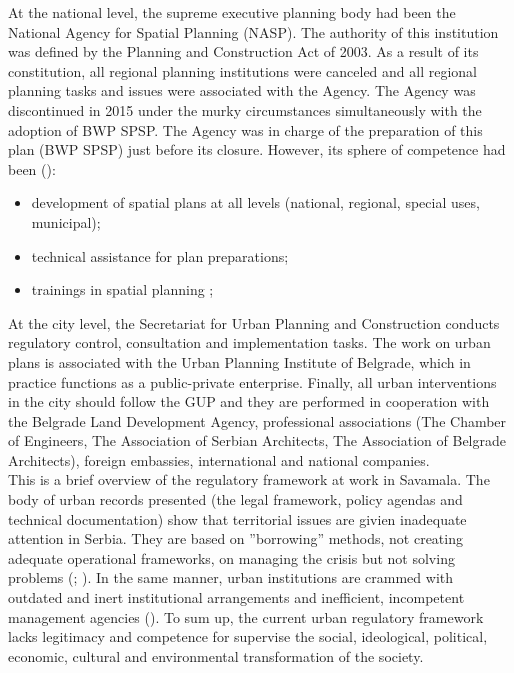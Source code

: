 \documentclass[11pt]{report}
\begin{document}
At the national level, the supreme executive planning body had been the National Agency for Spatial Planning (NASP). The authority of this institution was defined by the Planning and Construction Act of 2003.
As a result of its constitution, all regional planning institutions were canceled and all regional planning tasks and issues were associated with the Agency. 
The Agency was discontinued in 2015 under the murky circumstances simultaneously with the adoption of BWP SPSP. The Agency was in charge of the preparation of this plan (BWP SPSP) just before its closure.
However, its sphere of competence had been (\href{Maksic}{\citealt{maksic_european_2012}}):

\begin{itemize}
\item development of spatial plans at all levels (national, regional, special uses, municipal);
\item technical assistance for plan preparations;
\item trainings in spatial planning ;
\end{itemize}

At the city level, the Secretariat for Urban Planning and Construction conducts regulatory control, consultation and implementation tasks. The work on urban plans is associated with the Urban Planning Institute of Belgrade, which in practice functions as a public-private enterprise. Finally, all urban interventions in the city should follow the GUP and they are performed in cooperation with the Belgrade Land Development Agency, professional associations (The Chamber of Engineers, The Association of Serbian Architects, The Association of Belgrade Architects), foreign embassies, international and national companies.
\\
This is a brief overview of the regulatory framework at work in Savamala.  The body of urban records presented (the legal framework, policy agendas and technical documentation) show that territorial issues are givien inadequate attention in Serbia. They are based on ”borrowing” methods, not creating adequate operational frameworks, on managing the crisis but not solving problems 
(\href{Nedovic}{\citealt{nedovic-budic_adjustment_2001}}; \href{Vujosevic}{\citealt{vujosevic_conundrum_2012}}).
In the same manner, urban institutions are crammed with outdated and inert institutional arrangements and inefficient, incompetent management agencies (\href{Vujosevic}{\citealt{vujosevic_conundrum_2012}}).
To sum up, the current urban regulatory framework lacks legitimacy and competence for supervise the social, ideological, political, economic, cultural and environmental transformation of the society.
\end{document}
